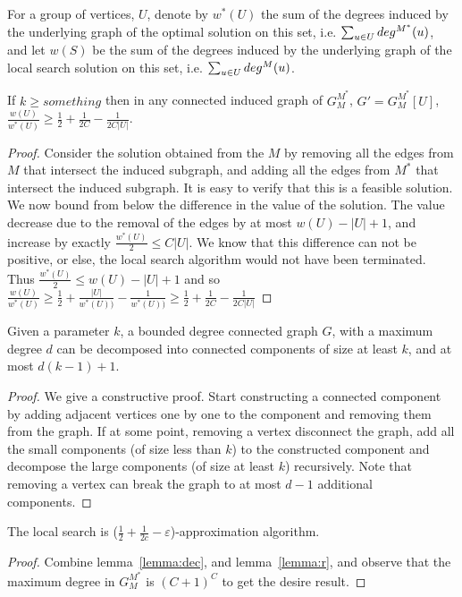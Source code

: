 For a group of vertices, $U$, denote by $w^*(U)$ the sum of the degrees 
induced by the underlying graph of the optimal solution on this set, i.e.
$\sum_{u \in U} \dinout[M^*](u)$, 
and let $w(S)$ be the sum of the degrees 
induced by the underlying graph of the local search solution on this set, i.e.
$\sum_{u \in U} \dinout(u)$.

\begin{lemma}
\label{lemma:r}
If $k \geq something$ then in any connected induced graph of $G^{M^*}_M$, 
$G'= G^{M^*}_M[U]$, 
$
\frac{w(U)}{w^*(U)} 
\geq \frac{1}{2} + \frac{1}{2C} - \frac{1}{2C|U|}
$.
\end{lemma}

\begin{proof}
Consider the solution obtained from the $M$ by removing all the edges from $M$
that intersect the induced subgraph, and adding all the edges from $M^*$ that
intersect the induced subgraph.
It is easy to verify that this is a feasible solution.
We now bound from below the difference in the value of the solution.
The value decrease due to the removal of the edges by at most $w(U) - |U| + 1$,
and increase by exactly $\frac{w^*(U)}{2} \leq C |U|$.
We know that this difference can not be positive, or else, the local search
algorithm would not have been terminated.
Thus 
$\frac{w^*(U)}{2} \leq w(U) - |U| + 1$ 
and so
$
\frac{w(U)}{w^*(U)} 
\geq 
\frac{1}{2} + \frac{|U|}{w^*(U))} - \frac{1}{w^*(U))}  
\geq
\frac{1}{2} + \frac{1}{2C} - \frac{1}{2C|U|}
$
\end{proof}


\begin{lemma}
\label{lemma:dec}
Given a parameter $k$, a bounded degree connected graph $G$, with a maximum
degree $d$ can be decomposed into connected components of size at least $k$, and at most
$d(k-1) + 1$.
\end{lemma}

\begin{proof}
We give a constructive proof.
Start constructing a connected component by adding adjacent vertices
one by one to the component and removing them from the graph.
If at some point, removing a vertex disconnect the graph, add all the small
components (of size less than $k$) to the constructed component and decompose
the large components (of size at least $k$) recursively.
Note that removing a vertex can break the graph to at most $d - 1$ additional
components.
\end{proof}

\begin{theorem}
The local search is ($\frac{1}{2} + \frac{1}{2c} - \varepsilon$)-approximation
algorithm.
\end{theorem}

\begin{proof}
Combine lemma~\ref{lemma:dec}, and lemma~\ref{lemma:r}, 
and observe that the maximum degree in $G^{M^*}_M$ is $(C + 1)^C$ to
get the desire result.
\end{proof}